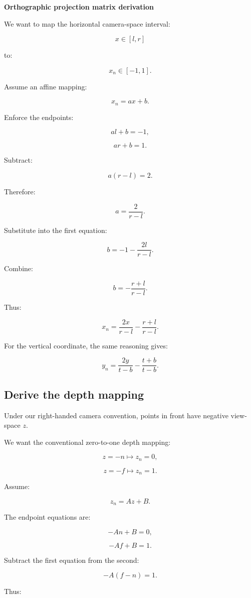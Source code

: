 \textbf{Orthographic projection matrix derivation}

We want to map the horizontal camera-space interval:

\[
 x\in[l,r]
\]

to:

\[
 x_n\in[-1,1].
\]

Assume an affine mapping:

\[
 x_n=ax+b.
\]

Enforce the endpoints:

\[
 al+b=-1,
\]

\[
 ar+b=1.
\]

Subtract:

\[
 a(r-l)=2.
\]

Therefore:

\[
 \boxed{ a=\frac2{r-l} }.
\]

Substitute into the first equation:

\[
 b=-1-\frac{2l}{r-l}.
\]

Combine:

\[
 \boxed{ b=-\frac{r+l}{r-l} }.
\]

Thus:

\[
 \boxed{ x_n= \frac{2x}{r-l} -\frac{r+l}{r-l} }.
\]

For the vertical coordinate, the same reasoning gives:

\[
 \boxed{ y_n= \frac{2y}{t-b} -\frac{t+b}{t-b} }.
\]

\subsection{Derive the depth mapping}\label{02-foundations-ii-ch033-derive-the-depth-mapping}

Under our right-handed camera convention, points in front have negative view-space \(z\).

We want the conventional zero-to-one depth mapping:

\[
 z=-n\longmapsto z_n=0,
\]

\[
 z=-f\longmapsto z_n=1.
\]

Assume:

\[
 z_n=Az+B.
\]

The endpoint equations are:

\[
 -An+B=0,
\]

\[
 -Af+B=1.
\]

Subtract the first equation from the second:

\[
 -A(f-n)=1.
\]

Thus:

